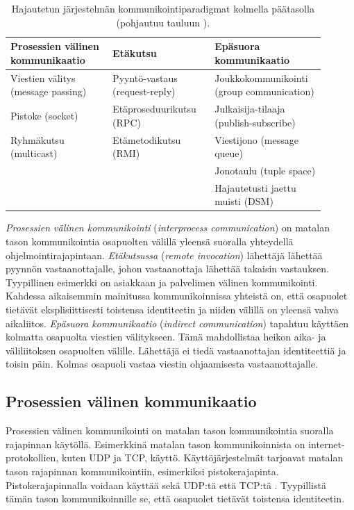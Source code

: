 \begin{table}[ht!]
	\caption{Hajautetun järjestelmän kommunikointiparadigmat kolmella päätasolla (pohjautuu tauluun \mbox{\cite[s.~46]{distributed-systems-concepts-and-design}}).}
	\label{tab:communication-paradigms}
	\begin{tabular}{p{0.3\linewidth} | p{0.3\linewidth} | p{0.3\linewidth}}
		\hline
		\textbf{Prosessien välinen kommunikaatio} & \textbf{Etäkutsu} & \textbf{Epäsuora kommunikaatio} \\
		\hline \hline
		Viestien välitys (message passing) & Pyyntö-vastaus (request-reply) & Joukkokommunikointi (group communication) \\
		\hline
		Pistoke (socket) & Etäproseduurikutsu (RPC) & Julkaisija-tilaaja (publish-subscribe) \\
		\hline
		Ryhmäkutsu (multicast) & Etämetodikutsu (RMI) & Viestijono (message queue) \\
		\hline
		& & Jonotaulu (tuple space) \\
		\hline
		& & Hajautetusti jaettu muisti (DSM) \\
		\hline
	\end{tabular}
\end{table}

\emph{Prosessien välinen kommunikointi} (\emph{interprocess communication}) on matalan tason kommunikointia osapuolten välillä yleensä suoralla yhteydellä ohjelmointirajapintaan. \emph{Etäkutsussa} (\emph{remote invocation}) lähettäjä lähettää pyynnön vastaanottajalle, johon vastaanottaja lähettää takaisin vastauksen. Tyypillinen esimerkki on asiakkaan ja palvelimen välinen kommunikointi. Kahdessa aikaisemmin mainitussa kommunikoinnissa yhteistä on, että osapuolet tietävät eksplisiittisesti toistensa identiteetin ja niiden välillä on yleensä vahva aikaliitos. \emph{Epäsuora kommunikaatio} (\emph{indirect communication}) tapahtuu käyttäen kolmatta osapuolta viestien välitykseen. Tämä mahdollistaa heikon aika- ja väliliitoksen osapuolten välille. Lähettäjä ei tiedä vastaanottajan identiteettiä ja toisin päin. Kolmas osapuoli vastaa viestin ohjaamisesta vastaanottajalle. \mbox{\cite[s.~43--45]{distributed-systems-concepts-and-design}}


\subsection{Prosessien välinen kommunikaatio}
\label{ch:interprocess-communication}
Prosessien välinen kommunikointi on matalan tason kommunikointia suoralla rajapinnan käytöllä. Esimerkkinä matalan tason kommunikoinnista on internet-protokollien, kuten UDP ja TCP, käyttö. Käyttöjärjestelmät tarjoavat matalan tason rajapinnan kommunikointiin, esimerkiksi pistokerajapinta. Pistokerajapinnalla voidaan käyttää sekä UDP:tä että TCP:tä \cite[s.~1152]{linux-programming-interface}. Tyypillistä tämän tason kommunikoinnille se, että osapuolet tietävät toistensa identiteetin.

